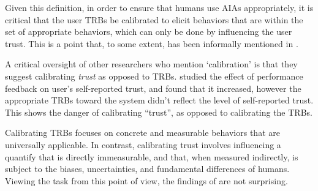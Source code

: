     Given this definition, in order to ensure that humans use AIAs appropriately, it is critical that the user TRBs be calibrated to elicit behaviors that are within the set of appropriate behaviors, which can only be done by influencing the user trust. This is a point that, to some extent, has been informally mentioned in \citet{Muir1994-ow,Muir1987-mk,Lillard2016-yg,Lee2004-pv,Hutchins2015-if}.

    A critical oversight of other researchers who mention `calibration' is that they suggest calibrating \emph{trust} as opposed to TRBs. \citet{Dzindolet2003-ts} studied the effect of performance feedback on user's self-reported trust, and found that it increased, however the appropriate TRBs toward the system didn't reflect the level of self-reported trust. This shows the danger of calibrating ``trust'', as opposed to calibrating the TRBs.

    Calibrating TRBs focuses on concrete and measurable behaviors that are universally applicable. In contrast, calibrating trust involves influencing a quantify that is directly immeasurable, and that, when measured indirectly, is subject to the biases, uncertainties, and fundamental differences of humans. Viewing the task from this point of view, the findings of \citeauthor{Dzindolet2003-ts} are not surprising.


